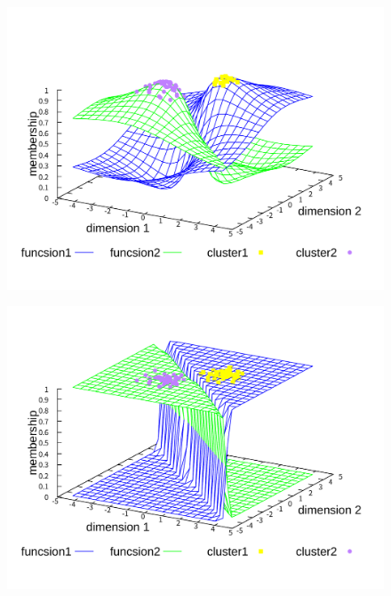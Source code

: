 \documentclass[twocolumn, a4paper]{icethesisabst}
\begin{document}
\begin{figure}[htbp]
 \centering
 \begin{minipage}{0.43\hsize}
  \includegraphics[width=\linewidth]{qFCMA-Em2-Lambda10.pdf}
  \label{fig:qFCMA-Em2-Lambda10}
 \end{minipage}
 \begin{minipage}{0.43\hsize}
  \includegraphics[width=\linewidth]{qFCMA-Em11-Lambda10.pdf}
  \label{fig:qFCMA-Em11-Lambda10}
 \end{minipage}
 \begin{minipage}{0.43\hsize}

\end{minipage}
\end{figure}
\end{document}
